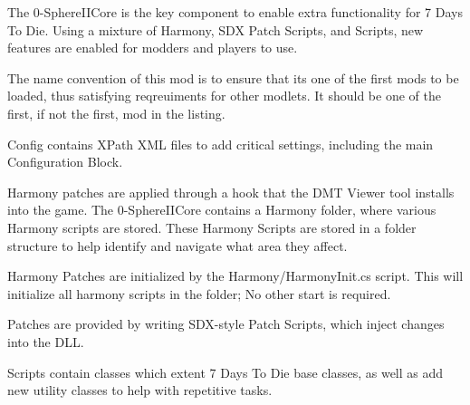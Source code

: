 The 0-\/Sphere\+I\+I\+Core is the key component to enable extra functionality for 7 Days To Die. Using a mixture of Harmony, S\+DX Patch Scripts, and Scripts, new features are enabled for modders and players to use.

The name convention of this mod is to ensure that it\textquotesingle{}s one of the first mods to be loaded, thus satisfying reqreuiments for other modlets. It should be one of the first, if not the first, mod in the listing.

Config contains X\+Path X\+ML files to add critical settings, including the main Configuration Block.

Harmony patches are applied through a hook that the D\+MT Viewer tool installs into the game. The 0-\/Sphere\+I\+I\+Core contains a Harmony folder, where various Harmony scripts are stored. These Harmony Scripts are stored in a folder structure to help identify and navigate what area they affect.

Harmony Patches are initialized by the Harmony/\+Harmony\+Init.\+cs script. This will initialize all harmony scripts in the folder; No other start is required.

Patches are provided by writing S\+D\+X-\/style Patch Scripts, which inject changes into the D\+LL.

Scripts contain classes which extent 7 Days To Die base classes, as well as add new utility classes to help with repetitive tasks. 